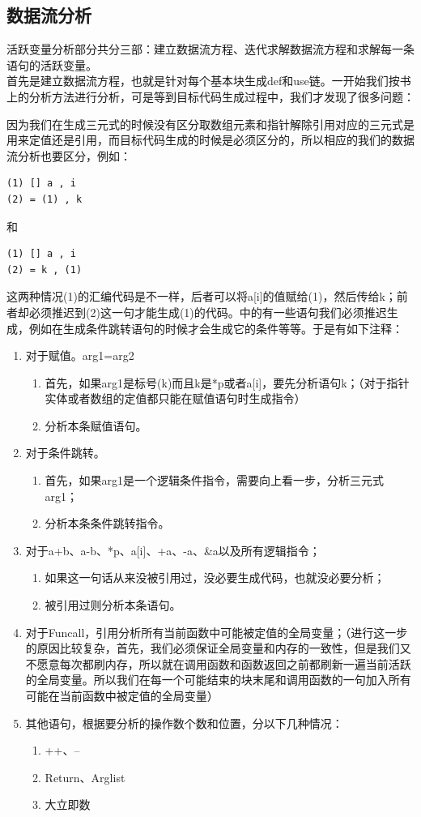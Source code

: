 \documentclass[12pt,a4paper,Flow]{report}
\begin{document}
\subsection{数据流分析}
活跃变量分析部分共分三部：建立数据流方程、迭代求解数据流方程和求解每一条语句的活跃变量。\\
\indent 首先是建立数据流方程，也就是针对每个基本块生成def和use链。一开始我们按书上的分析方法进行分析，可是等到目标代码生成过程中，我们才发现了很多问题：
\item 因为我们在生成三元式的时候没有区分取数组元素和指针解除引用对应的三元式是用来定值还是引用，而目标代码生成的时候是必须区分的，所以相应的我们的数据流分析也要区分，例如：
\begin{verbatim}
(1) [] a , i
(2) = (1) , k
\end{verbatim}
和
\begin{verbatim}
(1) [] a , i
(2) = k , (1)
\end{verbatim}
这两种情况(1)的汇编代码是不一样，后者可以将a[i]的值赋给(1)，然后传给k；前者却必须推迟到(2)这一句才能生成(1)的代码。中的有一些语句我们必须推迟生成，例如在生成条件跳转语句的时候才会生成它的条件等等。于是有如下注释：
\begin{enumerate}
\item 对于赋值。arg1=arg2
\begin{enumerate}
\item 首先，如果arg1是标号(k)而且k是*p或者a[i]，要先分析语句k；（对于指针实体或者数组的定值都只能在赋值语句时生成指令）
\item 分析本条赋值语句。
\end{enumerate}
\item 对于条件跳转。
\begin{enumerate}
\item 首先，如果arg1是一个逻辑条件指令，需要向上看一步，分析三元式arg1；
\item 分析本条条件跳转指令。
\end{enumerate}
\item 对于a+b、a-b、*p、a[i]、+a、-a、\&a以及所有逻辑指令；
\begin{enumerate}
\item 如果这一句话从来没被引用过，没必要生成代码，也就没必要分析；
\item 被引用过则分析本条语句。
\end{enumerate}
\item 对于Funcall，引用分析所有当前函数中可能被定值的全局变量；（进行这一步的原因比较复杂，首先，我们必须保证全局变量和内存的一致性，但是我们又不愿意每次都刷内存，所以就在调用函数和函数返回之前都刷新一遍当前活跃的全局变量。所以我们在每一个可能结束的块末尾和调用函数的一句加入所有可能在当前函数中被定值的全局变量）
\item 其他语句，根据要分析的操作数个数和位置，分以下几种情况：
\begin{enumerate}
\item ++、--
\item Return、Arglist
\item 大立即数
\end{enumerate}
\end{enumerate}
\end{document}
